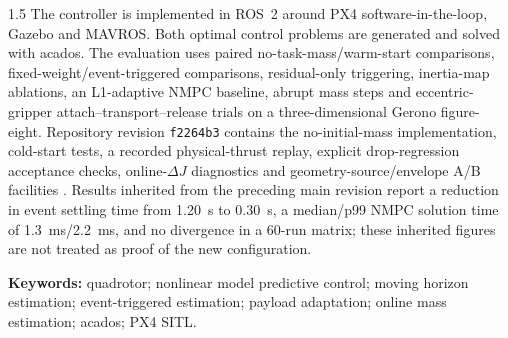 \begin{spacing}{1.5}
The controller is implemented in ROS~2 around PX4 software-in-the-loop, Gazebo and MAVROS. Both optimal control problems are generated and solved with acados. The evaluation uses paired no-task-mass/warm-start comparisons, fixed-weight/event-triggered comparisons, residual-only triggering, inertia-map ablations, an L1-adaptive NMPC baseline, abrupt mass steps and eccentric-gripper attach--transport--release trials on a three-dimensional Gerono figure-eight. Repository revision \texttt{f2264b3} contains the no-initial-mass implementation, cold-start tests, a recorded physical-thrust replay, explicit drop-regression acceptance checks, online-$\Delta J$ diagnostics and geometry-source/envelope A/B facilities \cite{yoyo2026mhenmpc}. Results inherited from the preceding main revision report a reduction in event settling time from \SI{1.20}{s} to \SI{0.30}{s}, a median/p99 NMPC solution time of \SI{1.3}{ms}/\SI{2.2}{ms}, and no divergence in a 60-run matrix; these inherited figures are not treated as proof of the new configuration.


\textbf{Keywords:} quadrotor; nonlinear model predictive control; moving horizon estimation; event-triggered estimation; payload adaptation; online mass estimation; acados; PX4 SITL.
\end{spacing}
\newpage
